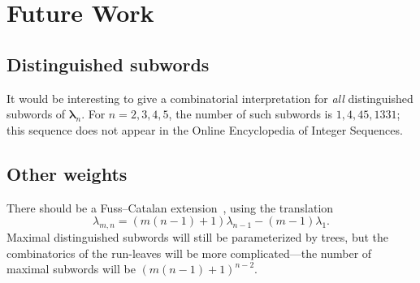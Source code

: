\documentclass[a4paper,10pt,leqno]{amsart}
\numberwithin{equation}{section}
\theoremstyle{definition}
\theoremstyle{remark}
\newcommand{\blambda}{\bm{\lambda}}
\begin{document}
\section{Future Work}
\label{sec:future_work}




\subsection{Distinguished subwords}
It would be interesting to give a combinatorial interpretation for \emph{all} distinguished subwords of $\blambda_n$.  For $n=2,3,4,5$, the number of such subwords is $1,4,45,1331$; this sequence does not appear in the Online Encyclopedia of Integer Sequences.


\subsection{Other weights}
There should be a Fuss--Catalan extension~\cite{williamsopac}, using the translation \[\lambda_{m,n}=(m(n-1)+1)\lambda_{n-1}-(m-1)\lambda_1.\]  Maximal distinguished subwords will still be parameterized by trees, but the combinatorics of the run-leaves will be more complicated---the number of maximal subwords will be $(m(n-1)+1)^{n-2}$.
\end{document}
